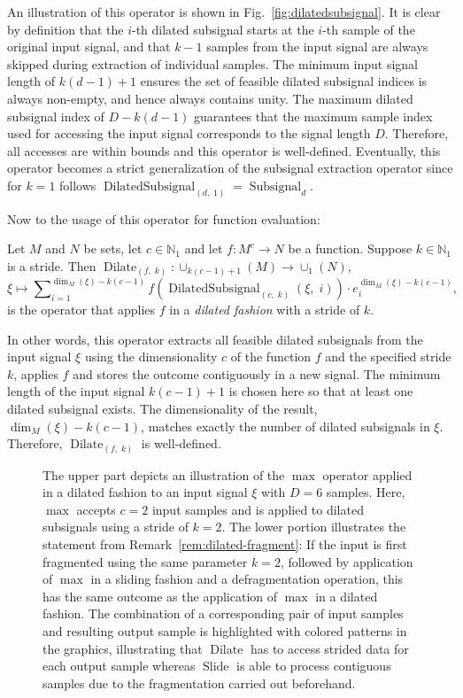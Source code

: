 \documentclass[journal]{IEEEtran}
\newcommand{\N}{\mathbb{N}}
\DeclareMathOperator{\Subsignal}{Subsignal}
\DeclareMathOperator{\Slide}{Slide}
\DeclareMathOperator{\DilatedSubsignal}{DilatedSubsignal}
\DeclareMathOperator{\Dilate}{Dilate}
\begin{document}
An illustration of this operator is shown in Fig.~\ref{fig:dilatedsubsignal}.
It is clear by definition that the $i$-th dilated subsignal starts at the $i$-th sample of the original input signal, and that $k - 1$ samples from the input signal are always skipped during extraction of individual samples.
The minimum input signal length of $k(d - 1) + 1$ ensures the set of feasible dilated subsignal indices is always non-empty, and hence always contains unity.
The maximum dilated subsignal index of $D - k(d - 1)$ guarantees that the maximum sample index used for accessing the input signal corresponds to the signal length $D$.
Therefore, all accesses are within bounds and this operator is well-defined.
Eventually, this operator becomes a strict generalization of the subsignal extraction operator since for $k = 1$ follows $\DilatedSubsignal_{(d,\; 1)} = \Subsignal_d$.

Now to the usage of this operator for function evaluation:
\begin{definition}
\label{def:dilate}
Let $M$ and $N$ be sets, let $c\in\N_1$ and let $f\colon M^c\to N$ be a function.
Suppose $k\in\N_1$ is a stride.
Then $\Dilate_{(f,\; k)}\colon\cup_{k(c - 1) + 1}(M)\to\cup_1(N)$,
\begin{displaymath}
  \xi\mapsto\sum\nolimits_{i = 1}^{\dim_M(\xi) - k(c - 1)} f(\DilatedSubsignal_{(c,\;k)}(\xi,\;i))\cdot e_i^{\dim_M(\xi) - k(c - 1)}\text{,}
\end{displaymath}
is the operator that applies $f$ in a \emph{dilated fashion} with a stride of $k$.
\end{definition}

In other words, this operator extracts all feasible dilated subsignals from the input signal $\xi$ using the dimensionality $c$ of the function $f$ and the specified stride $k$, applies $f$ and stores the outcome contiguously in a new signal.
The minimum length of the input signal $k(c - 1) + 1$ is chosen here so that at least one dilated subsignal exists.
The dimensionality of the result, $\dim_M(\xi) - k(c - 1)$, matches exactly the number of dilated subsignals in $\xi$.
Therefore, $\Dilate_{(f,\; k)}$ is well-defined.

\begin{figure}[t]
  \centering
  \caption{The upper part depicts an illustration of the $\max$ operator applied in a dilated fashion to an input signal $\xi$ with $D = 6$ samples.
    Here, $\max$ accepts $c = 2$ input samples and is applied to dilated subsignals using a stride of $k = 2$.
    The lower portion illustrates the statement from Remark~\ref{rem:dilated-fragment}:
    If the input is first fragmented using the same parameter $k = 2$, followed by application of $\max$ in a sliding fashion and a defragmentation operation, this has the same outcome as the application of $\max$ in a dilated fashion.
    The combination of a corresponding pair of input samples and resulting output sample is highlighted with colored patterns in the graphics, illustrating that $\Dilate$ has to access strided data for each output sample whereas $\Slide$ is able to process contiguous samples due to the fragmentation carried out beforehand.
}
  \label{fig:dilate}
\end{figure}
\end{document}
